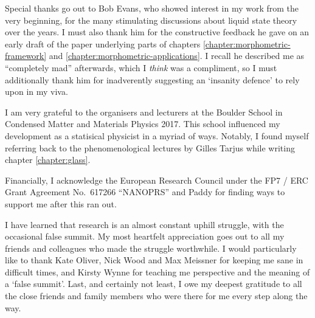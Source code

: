 Special thanks go out to Bob Evans, who showed interest in my work from the very beginning, for the many stimulating discussions about liquid state theory over the years.
I must also thank him for the constructive feedback he gave on an early draft of the paper underlying parts of chapters \ref{chapter:morphometric-framework} and \ref{chapter:morphometric-applications}.
I recall he described me as ``completely mad'' afterwards, which I \emph{think} was a compliment, so I must additionally thank him for inadverently suggesting an `insanity defence' to rely upon in my viva.

I am very grateful to the organisers and lecturers at the Boulder School in Condensed Matter and Materials Physics 2017.
This school influenced my development as a statisical physicist in a myriad of ways.
Notably, I found myself referring back to the phenomenological lectures by Gilles Tarjus while writing chapter \ref{chapter:glass}.

Financially, I acknowledge the European Research Council under the FP7 / ERC Grant Agreement No.\ 617266 ``NANOPRS'' and Paddy for finding ways to support me after this ran out.

I have learned that research is an almost constant uphill struggle, with the occasional false summit.
My most heartfelt appreciation goes out to all my friends and colleagues who made the struggle worthwhile.
I would particularly like to thank Kate Oliver, Nick Wood and Max Meissner for keeping me sane in difficult times, and Kirsty Wynne for teaching me perspective and the meaning of a `false summit'.
Last, and certainly not least, I owe my deepest gratitude to all the close friends and family members who were there for me every step along the way.

